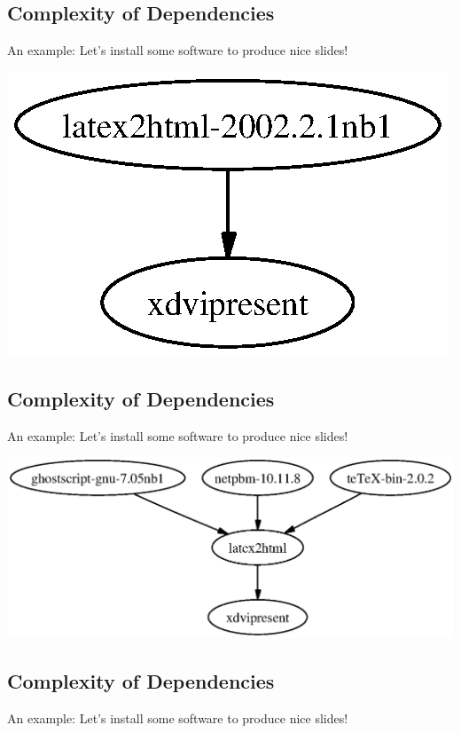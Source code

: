 \documentclass[xga]{xdvislides}
\begin{document}
\subsection{Complexity of Dependencies}
An example: Let's install some software to produce nice slides! \\

\vspace*{\fill}
\begin{center}
	\includegraphics[scale=1.0]{pics/xdvipresent.1.ps}
\end{center}

\subsection{Complexity of Dependencies}
An example: Let's install some software to produce nice slides! \\

\vspace*{\fill}
\begin{center}
	\includegraphics[scale=1.0]{pics/xdvipresent.2.ps}
\end{center}

\subsection{Complexity of Dependencies}
An example: Let's install some software to produce nice slides! \\
\end{document}
